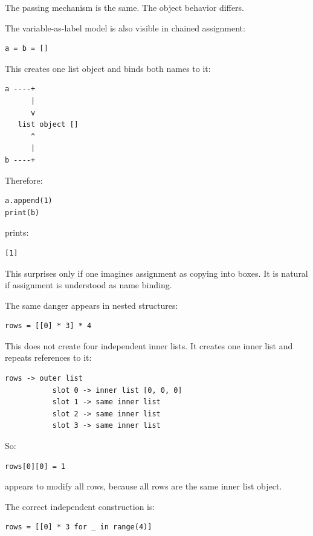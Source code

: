 The passing mechanism is the same. The object behavior differs.

The variable-as-label model is also visible in chained assignment:

\begin{verbatim}
a = b = []
\end{verbatim}

This creates one list object and binds both names to it:

\begin{verbatim}
a ----+
      |
      v
   list object []
      ^
      |
b ----+
\end{verbatim}

Therefore:

\begin{verbatim}
a.append(1)
print(b)
\end{verbatim}

prints:

\begin{verbatim}
[1]
\end{verbatim}

This surprises only if one imagines assignment as copying into boxes. It is natural if assignment is understood as name binding.

The same danger appears in nested structures:

\begin{verbatim}
rows = [[0] * 3] * 4
\end{verbatim}

This does not create four independent inner lists. It creates one inner list and repeats references to it:

\begin{verbatim}
rows -> outer list
           slot 0 -> inner list [0, 0, 0]
           slot 1 -> same inner list
           slot 2 -> same inner list
           slot 3 -> same inner list
\end{verbatim}

So:

\begin{verbatim}
rows[0][0] = 1
\end{verbatim}

appears to modify all rows, because all rows are the same inner list object.

The correct independent construction is:

\begin{verbatim}
rows = [[0] * 3 for _ in range(4)]
\end{verbatim}

